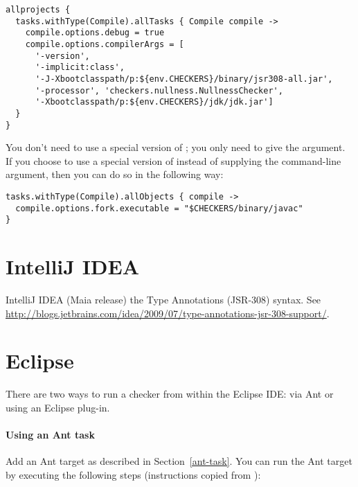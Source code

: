 \begin{Verbatim}
allprojects {
  tasks.withType(Compile).allTasks { Compile compile ->
    compile.options.debug = true
    compile.options.compilerArgs = [
      '-version',
      '-implicit:class',
      '-J-Xbootclasspath/p:${env.CHECKERS}/binary/jsr308-all.jar',
      '-processor', 'checkers.nullness.NullnessChecker',
      '-Xbootclasspath/p:${env.CHECKERS}/jdk/jdk.jar']
  }
}
\end{Verbatim}

You don't need to use a special version of ; you only need to
give the  argument.  If you choose to use a
special version of  instead of supplying the command-line
argument, then you can do so in the following way:

\begin{Verbatim}
tasks.withType(Compile).allObjects { compile ->
  compile.options.fork.executable = "$CHECKERS/binary/javac"
}
\end{Verbatim}


\section{IntelliJ IDEA\label{intellij}}

IntelliJ IDEA (Maia release)
the Type Annotations (JSR-308) syntax.
See \url{http://blogs.jetbrains.com/idea/2009/07/type-annotations-jsr-308-support/}.

\section{Eclipse\label{eclipse}}

There are two ways to run a checker from within the Eclipse IDE:  via Ant
or using an Eclipse plug-in.


\paragraph{Using an Ant task}

Add an Ant target as described in Section~\ref{ant-task}.  You can
run the Ant target by executing the following steps
(instructions copied from
):

